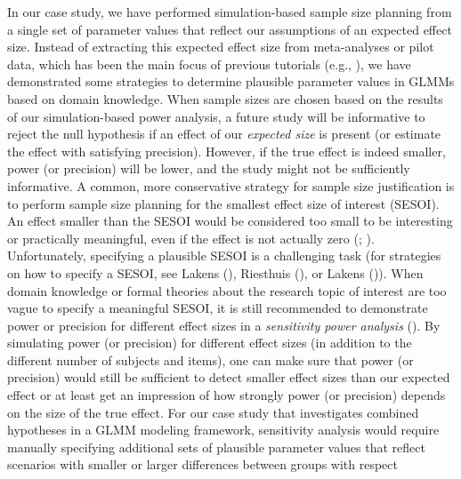 \documentclass[
  man,
  floatsintext,
  longtable,
  a4paper,
  nolmodern,
  notxfonts,
  notimes,
  colorlinks=true,linkcolor=blue,citecolor=blue,urlcolor=blue]{apa7}
\begin{document}
In our case study, we have performed simulation-based sample size
planning from a single set of parameter values that reflect our
assumptions of an expected effect size. Instead of extracting this
expected effect size from meta-analyses or pilot data, which has been
the main focus of previous tutorials (e.g.,
),
we have demonstrated some strategies to determine plausible parameter
values in GLMMs based on domain knowledge. When sample sizes are chosen
based on the results of our simulation-based power analysis, a future
study will be informative to reject the null hypothesis if an effect of
our \emph{expected size} is present (or estimate the effect with
satisfying precision). However, if the true effect is indeed smaller,
power (or precision) will be lower, and the study might not be
sufficiently informative. A common, more conservative strategy for
sample size justification is to perform sample size planning for the
smallest effect size of interest (SESOI). An effect smaller than the
SESOI would be considered too small to be interesting or practically
meaningful, even if the effect is not actually zero
(;
). Unfortunately, specifying a plausible SESOI is a
challenging task (for strategies on how to specify a SESOI, see Lakens
(), Riesthuis
(), or
Lakens ()). When
domain knowledge or formal theories about the research topic of interest
are too vague to specify a meaningful SESOI, it is still recommended to
demonstrate power or precision for different effect sizes in a
\emph{sensitivity power analysis}
(). By
simulating power (or precision) for different effect sizes (in addition
to the different number of subjects and items), one can make sure that
power (or precision) would still be sufficient to detect smaller effect
sizes than our expected effect or at least get an impression of how
strongly power (or precision) depends on the size of the true effect.
For our case study that investigates combined hypotheses in a GLMM
modeling framework, sensitivity analysis would require manually
specifying additional sets of plausible parameter values that reflect
scenarios with smaller or larger differences between groups with respect
\end{document}
